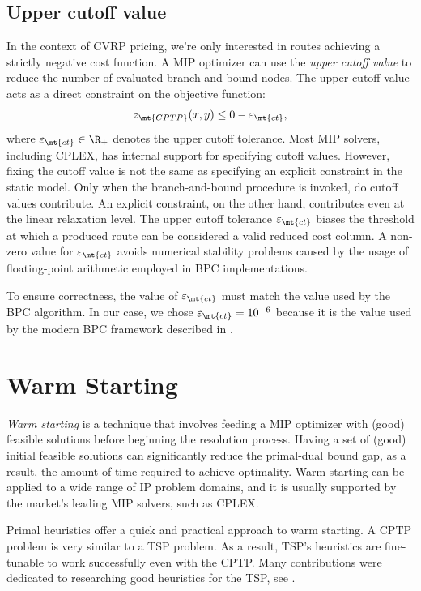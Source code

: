 \subsection{Upper cutoff value}
\label{sec:impl-upper-cutoff-value}

In the context of CVRP pricing, we're only interested in routes achieving a strictly negative cost function.
A MIP optimizer can use the \textit{upper cutoff value} to reduce the number of evaluated branch-and-bound nodes.
The upper cutoff value acts as a direct constraint on the objective function:
\begin{equation}
	z_\mt{CPTP}(x, y) \le 0 - \varepsilon_{\mt{ct}},
\end{equation}
where $\varepsilon_{\mt{ct}} \in \R_+$ denotes the upper cutoff tolerance.
Most MIP solvers, including CPLEX, has internal support for specifying cutoff values.
However, fixing the cutoff value is not the same as specifying an explicit constraint in the static model.
Only when the branch-and-bound procedure is invoked, do cutoff values contribute.
An explicit constraint, on the other hand, contributes even at the linear relaxation level.
The upper cutoff tolerance $\varepsilon_{\mt{ct}}$ biases the threshold at which a produced route
can be considered a valid reduced cost column.
A non-zero value for $\varepsilon_{\mt{ct}}$ avoids numerical
stability problems caused by the usage of floating-point arithmetic
employed in BPC implementations.

To ensure correctness, the value of $\varepsilon_{\mt{ct}}$ must match the value used by the BPC algorithm.
In our case, we chose $\varepsilon_{\mt{ct}} = 10^{-6}$ because it is the value used by the modern BPC framework described in \textcite{sadykov2021}.

\section{Warm Starting}
\label{sec:impl-warm-starting}

\textit{Warm starting} is a technique that involves feeding
a MIP optimizer with (good) feasible solutions
before beginning the resolution process.
Having a set of (good) initial feasible solutions
can significantly reduce the primal-dual bound gap,
as a result, the amount of time required to achieve optimality.
Warm starting can be applied to a wide range of IP problem domains,
and it is usually supported by the market's leading MIP solvers,
such as CPLEX.

Primal heuristics offer a quick and practical approach to warm starting.
A CPTP problem is very similar to a TSP problem.
As a result, TSP's heuristics are fine-tunable to work successfully even with the CPTP.
Many contributions were dedicated to researching good heuristics for the TSP,
see \cite{rosenkrantz1977, johnson1997, laporte1992, johnson2007, hoffman2013}.

